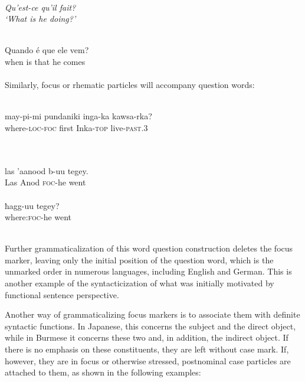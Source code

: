 \ea\label{ex:E97}
\langinfo{\LangFren}{}{}\\
 \itshape Qu'est-ce qu'il fait?\\
 \glt ‘What is he doing?’\\
\z

\ea\label{ex:E98}
\langinfo{\LangPort}{}{}\\
\gll    Quando  é  que  ele  vem?\\
 when  is  that  he  comes\\
\\
\z
\noindent Similarly, focus or rhematic particles will accompany question words:

\ea\label{ex:E99}
\\
\gll may-pi-mi  pundaniki  inga-ka  kawsa-rka?\\
 where-\textsc{loc}-\textsc{foc}  first  Inka-\textsc{top}  live-\textsc{past}.3\\
\\
\z

\ea\label{ex:E100}
\\
 \ea
 \gll las  'aanood  b-uu  tegey.\\
   Las  Anod  \textsc{foc}-he  went\\
\\
\ex
\gll  ħagg-uu  tegey?\\
  where:\textsc{foc}-he  went\\
\\
\z
\z
{}

\noindent Further grammaticalization of this word question construction deletes the focus marker, leaving only the initial position of the question word, which is the unmarked order in numerous languages, including English and German. This is another example of the syntacticization of what was initially motivated by functional sentence perspective.

Another way of grammaticalizing focus markers is to associate them with definite syntactic functions. In Japanese, this concerns the subject and the direct object, while in Burmese it concerns these two and, in addition, the indirect object. If there is no emphasis on these constituents, they are left without case mark. If, however, they are in focus or otherwise stressed, postnominal case particles are attached to them, as shown in the following examples:

